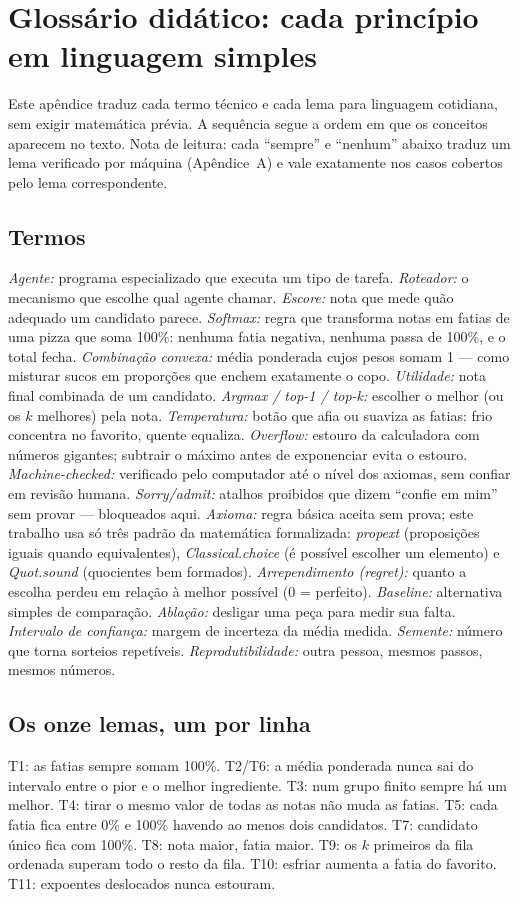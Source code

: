 \chapter{Glossário didático: cada princípio em linguagem simples}
\label{ap:glossario}
Este apêndice traduz cada termo técnico e cada lema para linguagem cotidiana, sem exigir matemática prévia. A sequência segue a ordem em que os conceitos aparecem no texto. Nota de leitura: cada ``sempre'' e ``nenhum'' abaixo traduz um lema verificado por máquina (Apêndice~A) e vale exatamente nos casos cobertos pelo lema correspondente.

\section{Termos}
\textit{Agente:} programa especializado que executa um tipo de tarefa. \textit{Roteador:} o mecanismo que escolhe qual agente chamar. \textit{Escore:} nota que mede quão adequado um candidato parece. \textit{Softmax:} regra que transforma notas em fatias de uma pizza que soma 100\%: nenhuma fatia negativa, nenhuma passa de 100\%, e o total fecha. \textit{Combinação convexa:} média ponderada cujos pesos somam 1 --- como misturar sucos em proporções que enchem exatamente o copo. \textit{Utilidade:} nota final combinada de um candidato. \textit{Argmax / top-1 / top-k:} escolher o melhor (ou os $k$ melhores) pela nota. \textit{Temperatura:} botão que afia ou suaviza as fatias: frio concentra no favorito, quente equaliza. \textit{Overflow:} estouro da calculadora com números gigantes; subtrair o máximo antes de exponenciar evita o estouro. \textit{Machine-checked:} verificado pelo computador até o nível dos axiomas, sem confiar em revisão humana. \textit{Sorry/admit:} atalhos proibidos que dizem ``confie em mim'' sem provar --- bloqueados aqui. \textit{Axioma:} regra básica aceita sem prova; este trabalho usa só três padrão da matemática formalizada: \textit{propext} (proposições iguais quando equivalentes), \textit{Classical.choice} (é possível escolher um elemento) e \textit{Quot.sound} (quocientes bem formados). \textit{Arrependimento (regret):} quanto a escolha perdeu em relação à melhor possível (0 = perfeito). \textit{Baseline:} alternativa simples de comparação. \textit{Ablação:} desligar uma peça para medir sua falta. \textit{Intervalo de confiança:} margem de incerteza da média medida. \textit{Semente:} número que torna sorteios repetíveis. \textit{Reprodutibilidade:} outra pessoa, mesmos passos, mesmos números.

\section{Os onze lemas, um por linha}
T1: as fatias sempre somam 100\%. T2/T6: a média ponderada nunca sai do intervalo entre o pior e o melhor ingrediente. T3: num grupo finito sempre há um melhor. T4: tirar o mesmo valor de todas as notas não muda as fatias. T5: cada fatia fica entre 0\% e 100\% havendo ao menos dois candidatos. T7: candidato único fica com 100\%. T8: nota maior, fatia maior. T9: os $k$ primeiros da fila ordenada superam todo o resto da fila. T10: esfriar aumenta a fatia do favorito. T11: expoentes deslocados nunca estouram.
